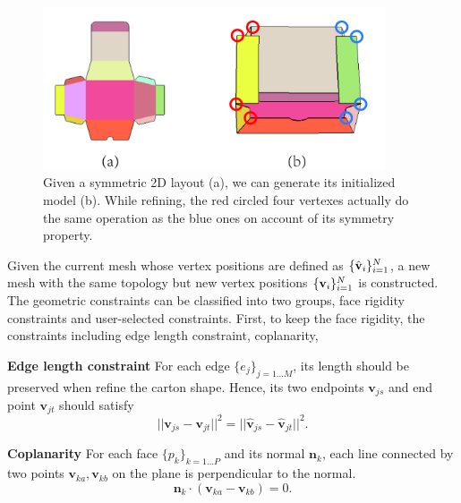 \begin{figure}
	\centering
	\includegraphics[width=0.9\textwidth]{images/symmetry.jpg}
	\caption{Given a symmetric 2D layout (a), we can generate its initialized model (b). While refining, the red circled four vertexes actually do the same operation as the blue ones on account of its symmetry property. }
	\label{fig:symmetry}
\end{figure}

Given the current mesh whose vertex positions are defined as $\{\hat{\mathbf{v}}_i\}^{N}_{i=1}$, a new mesh with the same topology but new vertex positions $\{\mathbf{v}_i\}^{N}_{i=1}$ is constructed.
%
The geometric constraints can be classified into two groups, face rigidity constraints and user-selected constraints. 
First, to keep the face rigidity, the constraints including edge length constraint, coplanarity, 


\noindent
\textbf{Edge length constraint} 
For each edge $\{e_j\}_{j=1...M}$, its length should be preserved when refine the carton shape.
Hence, its two endpoints $\mathbf{v}_{js}$ and end point $\mathbf{v}_{jt}$ should satisfy 
\begin{equation}
||\mathbf{v}_{js} - \mathbf{v}_{jt}||^2 = ||\mathbf{\hat{v}}_{js} - \mathbf{\hat{v}}_{jt}||^2.
\label{equ:edge}
\end{equation}

\noindent
\textbf{Coplanarity} For each face $\{p_k\}_{k=1 \dots P}$ and its normal $\mathbf{n}_k$, each line connected by two points $\mathbf{v}_{ka}, \mathbf{v}_{kb}$ on the plane is perpendicular to the normal. 
\begin{equation}
\mathbf{n}_k \cdot (\mathbf{v}_{ka} - \mathbf{v}_{kb}) = 0.
\label{equ:coplane}
\end{equation}

